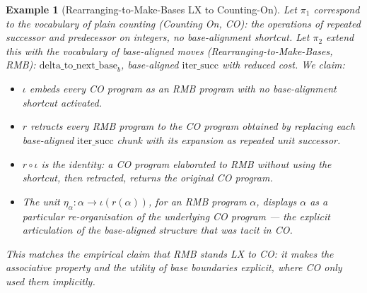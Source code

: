 \documentclass[11pt]{article}
\newtheorem{example}{Example}
\begin{document}
\begin{example}[Rearranging-to-Make-Bases LX to Counting-On]
Let $\pi_1$ correspond to the vocabulary of plain counting (Counting
On, CO): the operations of repeated successor and predecessor on
integers, no base-alignment shortcut. Let $\pi_2$ extend this with
the vocabulary of base-aligned moves (Rearranging-to-Make-Bases, RMB):
$\mathrm{delta\_to\_next\_base}_b$, base-aligned $\mathrm{iter\_succ}$
with reduced cost. We claim:
\begin{itemize}[noitemsep,topsep=2pt]
  \item $\iota$ embeds every CO program as an RMB program with no
        base-alignment shortcut activated.
  \item $r$ retracts every RMB program to the CO program obtained by
        replacing each base-aligned $\mathrm{iter\_succ}$ chunk with
        its expansion as repeated unit successor.
  \item $r \circ \iota$ is the identity: a CO program elaborated to
        RMB without using the shortcut, then retracted, returns the
        original CO program.
  \item The unit $\eta_\alpha : \alpha \to \iota(r(\alpha))$, for an
        RMB program $\alpha$, displays $\alpha$ as a particular
        re-organisation of the underlying CO program — the explicit
        articulation of the base-aligned structure that was tacit in
        CO.
\end{itemize}
This matches the empirical claim that RMB stands LX to CO: it makes
the associative property and the utility of base boundaries explicit,
where CO only used them implicitly.
\end{example}
\end{document}
